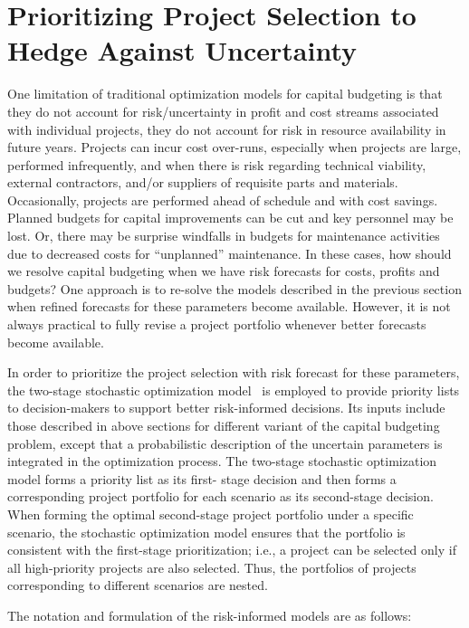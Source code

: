 \section{Prioritizing Project Selection to Hedge Against Uncertainty}
\label{sec:StochasticCapitalBudgeting}

One limitation of traditional optimization models for capital budgeting is that
they do not account for risk/uncertainty in profit and cost streams associated
with individual projects, they do not account for risk in resource availability
in future years. Projects can incur cost over-runs, especially when projects are
large, performed infrequently, and when there is risk regarding technical viability,
external contractors, and/or suppliers of requisite parts and materials.
Occasionally, projects are performed ahead of schedule and with cost savings.
Planned budgets for capital improvements can be cut and key personnel may be
lost. Or, there may be surprise windfalls in budgets for maintenance activities
due to decreased costs for “unplanned” maintenance. In these cases, how should
we resolve capital budgeting when we have risk forecasts for costs, profits and
budgets? One approach is to re-solve the models described in the previous
section when refined forecasts for these parameters become available. However,
it is not always practical to fully revise a project portfolio whenever better
forecasts become available.

In order to prioritize the project selection with risk forecast for these
parameters, the two-stage stochastic optimization model~\cite{PrioritizingProjectSelection} is employed to provide
priority lists to decision-makers to support better risk-informed decisions.
Its inputs include those described in above sections for different variant of
the capital budgeting problem, except that a probabilistic description of the
uncertain parameters is integrated in the optimization process. The two-stage
stochastic optimization model forms a priority list as its first- stage decision
and then forms a corresponding project portfolio for each scenario as its
second-stage decision. When forming the optimal second-stage project portfolio
under a specific scenario, the stochastic optimization model ensures that the
portfolio is consistent with the first-stage prioritization; i.e., a project can
be selected only if all high-priority projects are also selected. Thus, the
portfolios of projects corresponding to different scenarios are nested.

The notation and formulation of the risk-informed models are as follows:

